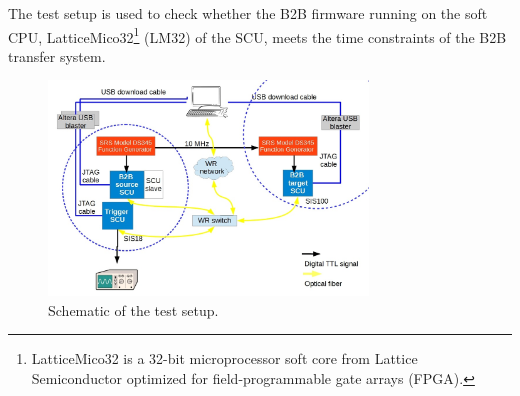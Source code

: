 The test setup is used to check whether the B2B firmware running on the soft CPU, LatticeMico32\footnote{LatticeMico32 is a 32-bit microprocessor soft core from Lattice Semiconductor optimized for field-programmable gate arrays (FPGA).} (LM32) of the SCU, meets the time constraints of the B2B transfer system.  

\begin{figure}[!htb]
   \centering   
   \includegraphics*[width=85mm]{schematic_setup.jpg}
   \caption{Schematic of the test setup.}
   \label{setup}
\end{figure}
